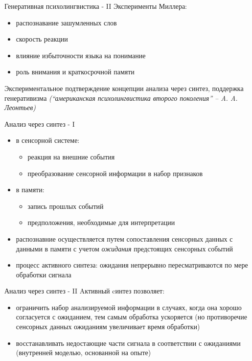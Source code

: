 \documentclass{beamer}
\begin{document}
\begin{frame}{Генеративная психолингвистика - II}
Эксперименты Миллера:
\bigskip
\begin{itemize}
	\item распознавание зашумленных слов
	\medskip
	\item скорость реакции
	\medskip
	\item влияние избыточности языка на понимание
	\medskip
	\item роль внимания и краткосрочной памяти
\end{itemize}
\bigskip
Экспериментальное подтверждение концепции анализа через синтез, поддержка генеративизма \textit{(``американская психолингвистика второго поколения'' -- A. A. Леонтьев)}
\end{frame}

\begin{frame}{Анализ через синтез - I}
\begin{itemize}
	\item в сенсорной системе:
		\begin{itemize}
			\item реакция на внешние события
			\smallskip
			\item преобразование сенсорной информации в набор признаков
		\end{itemize}
	\medskip
	\item в памяти:
		\begin{itemize}
			\item запись прошлых событий
			\smallskip
			\item предположения, необходимые для интерпретации
		\end{itemize}
	\medskip
	\item распознавние осуществляется путем сопоставления сенсорных данных с данными в памяти с учетом \textit{ожидания} предстоящих сенсорных событий
	\item процесс активного синтеза: ожидания непрерывно пересматриваются по мере обработки сигнала
\end{itemize}
\end{frame}

\begin{frame}{Анализ через синтез - II}
Aктивный cинтез позволяет:
\bigskip
\begin{itemize}
	\item ограничить набор анализируемой информации в случаях, когда она хорошо согласуется с ожиданием, тем самым обработка ускоряется (но противоречие сенсорных данных ожиданиям увеличивает время обработки)
	\medskip
	\item восстанавливать недостающие части сигнала в соответствии с ожиданиями (внутренней моделью, основанной на опыте)
\end{itemize}
\end{frame}
\end{document}
